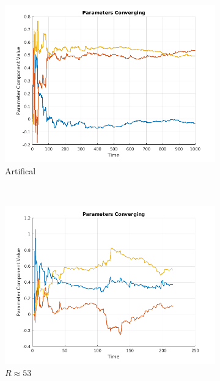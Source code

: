 \documentclass[11pt, fleqn]{article}
\begin{document}
\begin{figure}[!h]
    \centering
	\begin{subfigure}[b]{0.28\textwidth}
        \includegraphics[width=\textwidth]{kalman-parameter-converge-artificial.png}
	\caption{Artifical}
	\label{fig:kalman-parameter-converge-artificial}
    \end{subfigure}
    ~ 
    \begin{subfigure}[b]{0.28\textwidth}
        \includegraphics[width=\textwidth]{kalman-parameter-converge.png}
		\caption{$R \approx 53$}
		\label{fig:kalman-parameter-converge}
    \end{subfigure}
	~ 
    \begin{subfigure}[b]{0.3\textwidth}

\end{subfigure}
\end{figure}
\end{document}
